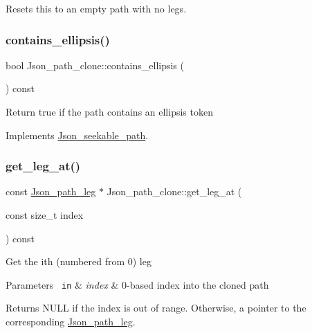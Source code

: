 Resets this to an empty path with no legs. \mbox{\label{classJson__path__clone_ab1c40c5424e17ba7dddaf168c36fbced}} 
\subsubsection{\texorpdfstring{contains\+\_\+ellipsis()}{contains\_ellipsis()}}
{\footnotesize\ttfamily bool Json\+\_\+path\+\_\+clone\+::contains\+\_\+ellipsis (\begin{DoxyParamCaption}{ }\end{DoxyParamCaption}) const\hspace{0.3cm}{\ttfamily [virtual]}}

Return true if the path contains an ellipsis token 

Implements \mbox{\hyperlink{classJson__seekable__path_a3c853224d800bf230962d9521fe466d9}{Json\+\_\+seekable\+\_\+path}}.

\mbox{\label{classJson__path__clone_afc7f1eee2eb7e50ab90c0a52dd2e7fa4}} 
\subsubsection{\texorpdfstring{get\+\_\+leg\+\_\+at()}{get\_leg\_at()}}
{\footnotesize\ttfamily const \mbox{\hyperlink{classJson__path__leg}{Json\+\_\+path\+\_\+leg}} $\ast$ Json\+\_\+path\+\_\+clone\+::get\+\_\+leg\+\_\+at (\begin{DoxyParamCaption}\item[{const size\+\_\+t}]{index }\end{DoxyParamCaption}) const\hspace{0.3cm}{\ttfamily [virtual]}}

Get the ith (numbered from 0) leg


\begin{DoxyParams}[1]{Parameters}
\mbox{\texttt{ in}}  & {\em index} & 0-\/based index into the cloned path\\
\hline
\end{DoxyParams}
\begin{DoxyReturn}{Returns}
N\+U\+LL if the index is out of range. Otherwise, a pointer to the corresponding \mbox{\hyperlink{classJson__path__leg}{Json\+\_\+path\+\_\+leg}}. 
\end{DoxyReturn}


